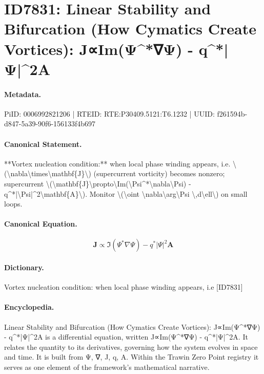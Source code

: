 \section*{ID7831: Linear Stability and Bifurcation (How Cymatics Create Vortices): J∝Im(Ψ\textasciicircum{}*∇Ψ) - q\textasciicircum{}*|Ψ|\textasciicircum{}2A}
\paragraph{Metadata.}
PiID: 0006992821206 | RTEID: RTE:P30409.5121:T6.1232 | UUID: f261594b-d847-5a39-90f6-156133f4b697

\paragraph{Canonical Statement.}
**Vortex nucleation condition:** when local phase winding appears, i.e. \textbackslash{}(\textbackslash{}nabla\textbackslash{}times\textbackslash{}mathbf\{J\}\textbackslash{}) (supercurrent vorticity) becomes nonzero; supercurrent \textbackslash{}(\textbackslash{}mathbf\{J\}\textbackslash{}propto\textbackslash{}Im(\textbackslash{}Psi\textasciicircum{}*\textbackslash{}nabla\textbackslash{}Psi) - q\textasciicircum{}*|\textbackslash{}Psi|\textasciicircum{}2\textbackslash{}mathbf\{A\}\textbackslash{}). Monitor \textbackslash{}(\textbackslash{}oint \textbackslash{}nabla\textbackslash{}arg\textbackslash{}Psi \textbackslash{},d\textbackslash{}ell\textbackslash{}) on small loops.

\paragraph{Canonical Equation.}
\[
\mathbf{J}\propto\Im(\Psi^*\nabla\Psi) - q^*|\Psi|^2\mathbf{A}
\]

\paragraph{Dictionary.}
Vortex nucleation condition: when local phase winding appears, i.e [ID7831]

\paragraph{Encyclopedia.}
Linear Stability and Bifurcation (How Cymatics Create Vortices): J∝Im(Ψ\textasciicircum{}*∇Ψ) - q\textasciicircum{}*|Ψ|\textasciicircum{}2A is a differential equation, written J∝Im(Ψ\textasciicircum{}*∇Ψ) - q\textasciicircum{}*|Ψ|\textasciicircum{}2A. It relates the quantity to its derivatives, governing how the system evolves in space and time. It is built from Ψ, ∇, J, q, A. Within the Trawin Zero Point registry it serves as one element of the framework's mathematical narrative.
